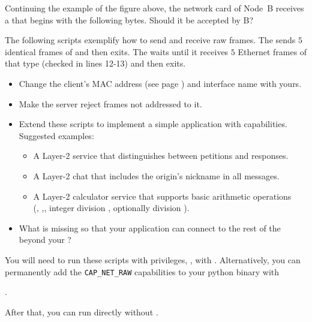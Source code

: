 \begin{exercise} Continuing the example of the figure above, the network card of Node~B receives
a  that begins with the following bytes. Should it be accepted by B?
\begin{center}
\end{center}
\end{exercise}

\newpage
\begin{exercise}
The following scripts exemplify how to send and receive raw  frames. 
The  sends $5$ identical frames of   and then exits.
The  waits until it receives $5$ Ethernet frames of that type (checked in lines 12-13) and then exits.
% 
\begin{itemize}
\item Change the client's MAC address (see page \pageref{sec:layer2:practical}) and interface name with yours.
\item Make the server reject frames not addressed to it.
\item Extend these scripts to implement a simple application with  capabilities.\\
  Suggested examples:
    \begin{itemize}
    \item A Layer-2  service that distinguishes between petitions and responses.
    \item A Layer-2  chat that includes the origin's nickname in all messages.
    \item A Layer-2 calculator service that supports basic arithmetic operations\\
      (\inlineCode{+}, \inlineCode{-},\inlineCode{*}, integer division \inlineCode{//}, optionally division \inlineCode{/}).
    \end{itemize}
\item What is missing so that your application can connect to the rest of the  beyond your ?
\end{itemize}

\begin{remark}
You will need to run these scripts with privileges, \eg, with .
% 
Alternatively, you can permanently add the \texttt{CAP\_NET\_RAW} capabilities
to your python binary with
\begin{center}
.  
\end{center}
% 
After that, you can run  directly without .\\[-0.5cm]
\end{remark}
\end{exercise}

\begin{center}
\end{center}

\begin{center}
\end{center}
